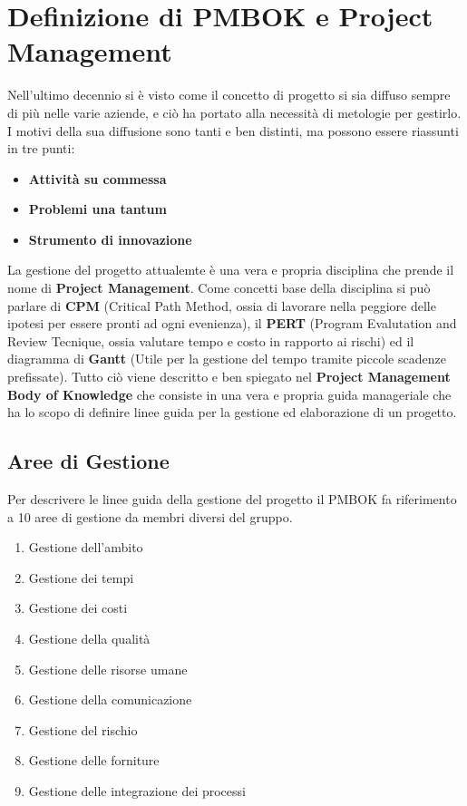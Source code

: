 \documentclass{report}
\begin{document}
\section{Definizione di PMBOK e Project Management}
Nell'ultimo decennio si è visto come il concetto di progetto si sia diffuso sempre di più nelle varie aziende, e ciò ha portato alla necessità di metologie per gestirlo.
I motivi della sua diffusione sono tanti e ben distinti, ma possono essere riassunti in tre punti:
\begin{itemize}
    \item \textbf{Attività su commessa}
    \item \textbf{Problemi una tantum}
    \item \textbf{Strumento di innovazione}
\end{itemize}
La gestione del progetto attualemte è una vera e propria disciplina che prende il nome di \textbf{Project Management}.
Come concetti base della disciplina si può parlare di \textbf{CPM} (Critical Path Method, ossia di lavorare nella peggiore delle ipotesi per essere pronti ad ogni evenienza), il \textbf{PERT} (Program Evalutation and Review Tecnique, ossia valutare tempo e costo in rapporto ai rischi) ed il diagramma di \textbf{Gantt} (Utile per la gestione del tempo tramite piccole scadenze prefissate).
Tutto ciò viene descritto e ben spiegato nel \textbf{Project Management Body of Knowledge} che consiste in una vera e propria guida manageriale che ha lo scopo di definire linee guida per la gestione ed elaborazione di un progetto.

\subsection{Aree di Gestione}
Per descrivere le linee guida della gestione del progetto il PMBOK fa riferimento a 10 aree di gestione da membri diversi del gruppo.
\begin{enumerate}
    \item Gestione dell'ambito
    \item Gestione dei tempi
    \item Gestione dei costi
    \item Gestione della qualità
    \item Gestione delle risorse umane
    \item Gestione della comunicazione
    \item Gestione del rischio
    \item Gestione delle forniture
    \item Gestione delle integrazione dei processi
\end{enumerate}
\end{document}
